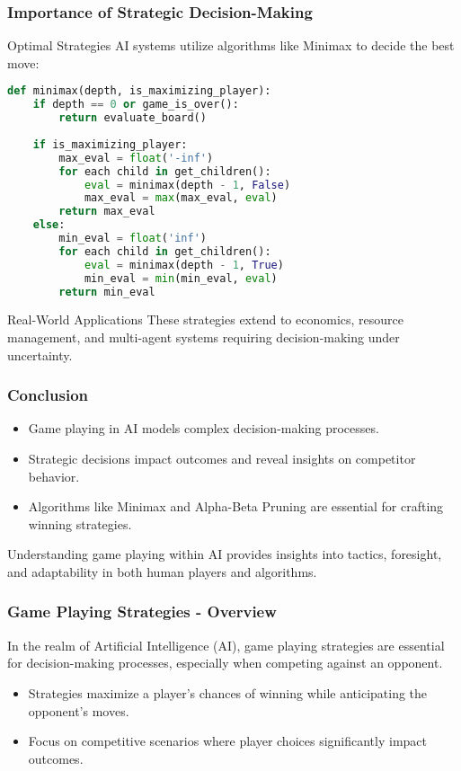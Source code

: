 \documentclass[aspectratio=169]{beamer}
\begin{document}
\begin{frame}[fragile]
    \frametitle{Importance of Strategic Decision-Making}
    \begin{block}{Optimal Strategies}
        AI systems utilize algorithms like Minimax to decide the best move:
        \begin{lstlisting}[language=Python]
def minimax(depth, is_maximizing_player):
    if depth == 0 or game_is_over():
        return evaluate_board()
    
    if is_maximizing_player:
        max_eval = float('-inf')
        for each child in get_children():
            eval = minimax(depth - 1, False)
            max_eval = max(max_eval, eval)
        return max_eval
    else:
        min_eval = float('inf')
        for each child in get_children():
            eval = minimax(depth - 1, True)
            min_eval = min(min_eval, eval)
        return min_eval
        \end{lstlisting}
    \end{block}

    \begin{block}{Real-World Applications}
        These strategies extend to economics, resource management, and multi-agent systems requiring decision-making under uncertainty.
    \end{block}
\end{frame}

\begin{frame}[fragile]
    \frametitle{Conclusion}
    \begin{itemize}
        \item Game playing in AI models complex decision-making processes.
        \item Strategic decisions impact outcomes and reveal insights on competitor behavior.
        \item Algorithms like Minimax and Alpha-Beta Pruning are essential for crafting winning strategies.
    \end{itemize}
    
    Understanding game playing within AI provides insights into tactics, foresight, and adaptability in both human players and algorithms.
\end{frame}

\begin{frame}[fragile]
    \frametitle{Game Playing Strategies - Overview}
    In the realm of Artificial Intelligence (AI), game playing strategies are essential for decision-making processes, especially when competing against an opponent. 
    \begin{itemize}
        \item Strategies maximize a player's chances of winning while anticipating the opponent's moves.
        \item Focus on competitive scenarios where player choices significantly impact outcomes.
    \end{itemize}
\end{frame}
\end{document}

